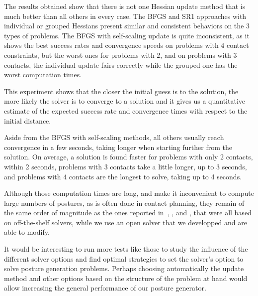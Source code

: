 The results obtained show that there is not one Hessian update method that is much better than all others in every case.
The BFGS and SR1 approaches with individual or grouped Hessians present similar and consistent behaviors on the 3 types of problems.
The BFGS with self-scaling update is quite inconsistent, as it shows the best success rates and convergence speeds on problems with 4 contact constraints, but the worst ones for problems with 2, and on problems with 3 contacts, the individual update fairs correctly while the grouped one has the worst computation times.

This experiment shows that the closer the initial guess is to the solution, the more likely the solver is to converge to a solution and it gives us a quantitative estimate of the expected success rate and convergence times with respect to the initial distance.

Aside from the BFGS with self-scaling methods, all others usually reach convergence in a few seconds, taking longer when starting further from the solution.
On average, a solution is found faster for problems with only 2 contacts, within 2 seconds, problems with 3 contacts take a little longer, up to 3 seconds, and problems with 4 contacts are the longest to solve, taking up to 4 seconds.

Although those computation times are long, and make it inconvenient to compute large numbers of postures, as is often done in contact planning, they remain of the same order of magnitude as the ones reported in~\cite{brossette:RAM:2013}, \cite{escande:iros:2006}, \cite{bouyarmane2011autonomous} and \cite{hauser:ijrr:2008}, that were all based on off-the-shelf solvers, while we use an open solver that we developped and are able to modify.

It would be interesting to run more tests like those to study the influence of the different solver options and find optimal strategies to set the solver's option to solve posture generation problems.
Perhaps choosing automatically the update method and other options based on the structure of the problem at hand would allow increasing the general performance of our posture generator.

